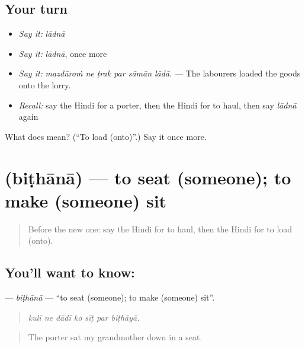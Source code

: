 \subsection*{Your turn}
\begin{itemize}
\raggedright
  \item \emph{Say it:} \emph{lādnā}
  \item \emph{Say it:} \emph{lādnā}, once more
  \item \emph{Say it:} \emph{mazdūroṁ ne ṭrak par sāmān lādā.} — The labourers loaded the goods onto the lorry.
  \item \emph{Recall:} say the Hindi for a porter, then the Hindi for to haul, then say \emph{lādnā} again
\end{itemize}

\begin{tcolorbox}[breakable,colback=teal!4,colframe=teal!35!black,title={Before you move on}]
What does  mean? (\textquotedblleft{}To load (onto)\textquotedblright{}.) Say it once more.
\end{tcolorbox}
\section[\texorpdfstring{\hi{बिठाना} (biṭhānā)}{बिठाना (biṭhānā)}]{ (biṭhānā) — to seat (someone); to make (someone) sit}

\label{lesson:HI-C398-bithana}



\begin{quote}
Before the new one: say the Hindi for to haul, then the Hindi for to load (onto).
\end{quote}

\subsection*{You'll want to know: }
\textbf{} — \emph{biṭhānā} — \textquotedblleft{}to seat (someone); to make (someone) sit\textquotedblright{}.

\begin{quote}
      
\end{quote}

\begin{quote}
\emph{kulī ne dādī ko sīṭ par biṭhāyā.}
\end{quote}

\begin{quote}
The porter sat my grandmother down in a seat.
\end{quote}

